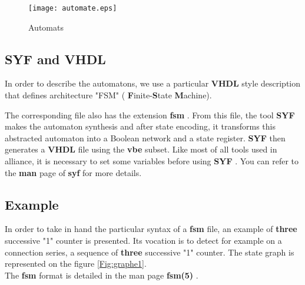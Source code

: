 \documentclass[12pt]{article}
\begin{document}
{\begin{figure}[H]\centering
  \texttt{[image: automate.eps]}
 \caption{Automats}
  \label{Fig:automaton}
\end{figure}


\subsection{SYF and VHDL}
In order to describe the automatons, we use a particular {\bf VHDL }
style description that defines architecture "FSM" ({ \bf
F}inite-{\bf S}tate { \bf M}achine).

The corresponding file also has the extension { \bf fsm }. From
this file, the tool { \bf SYF } makes the automaton synthesis and
after state encoding, it transforms this abstracted automaton into
a Boolean network and a state register. 
{ \bf SYF } then generates a { \bf VHDL } file using the 
{\bf vbe } subset. 
Like most of all tools used in alliance, it is
necessary to set some variables before using { \bf SYF }. 
You can refer to the { \bf man } page of { \bf syf } for more details.

\subsection{Example}

In order to take in hand the particular syntax of a {
\bf fsm } file, an example of { \bf three } successive "1" counter
is presented. Its vocation is to detect for example on a
connection series, a sequence of { \bf three } successive "1" counter.
The state graph is represented on the figure
\ref{Fig:graphe1}.\\
The { \bf fsm } format is detailed in the man page { \bf fsm(5) }.

}
\end{document}
